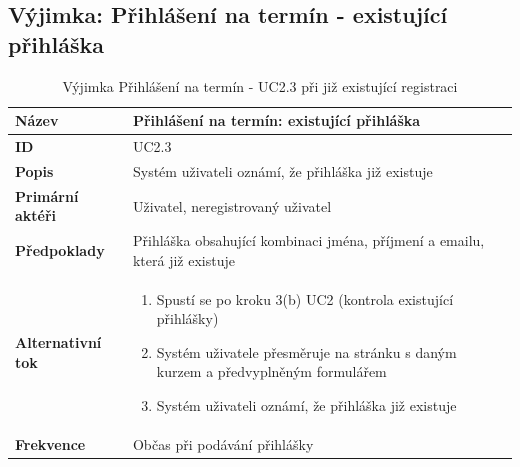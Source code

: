 \documentclass[12pt,a4paper,titlepage,final]{report}
\begin{document}
\newpage

\subsection{Výjimka: Přihlášení na termín - existující přihláška}
\begin{table}[!h]
	\begin{center}
    \begin{tabular}{ | p{4.2cm} | p{12.2cm} | }
    \hline
    \textbf{Název} & Přihlášení na termín: existující přihláška
    \\ \hline
    
	\textbf{ID} & UC2.3
	\\ \hline
	
	\textbf{Popis} & Systém uživateli oznámí, že přihláška již existuje
	\\ \hline
	    
	\textbf{Primární aktéři} & Uživatel, neregistrovaný uživatel
	\\ \hline
	
	
	\textbf{Předpoklady} & Přihláška obsahující kombinaci jména, příjmení a emailu, která již existuje
    \\ \hline    
               
    \textbf{Alternativní tok} & 
    \vspace{-3.5mm}
	\begin{enumerate}
        \itemsep0em 	
		\item Spustí se po kroku 3(b) UC2 (kontrola existující přihlášky)
		\item Systém uživatele přesměruje na stránku s daným kurzem a předvyplněným formulářem
		\item Systém uživateli oznámí, že přihláška již existuje
	\end{enumerate}	     
    \\ \hline    
    
	\textbf{Frekvence} & Občas při podávání přihlášky
	\\ \hline
	\end{tabular}
		\caption{Výjimka Přihlášení na termín - UC2.3 při již existující registraci}
	\end{center}

\end{table}
\vspace{-0.5cm}
\end{document}
